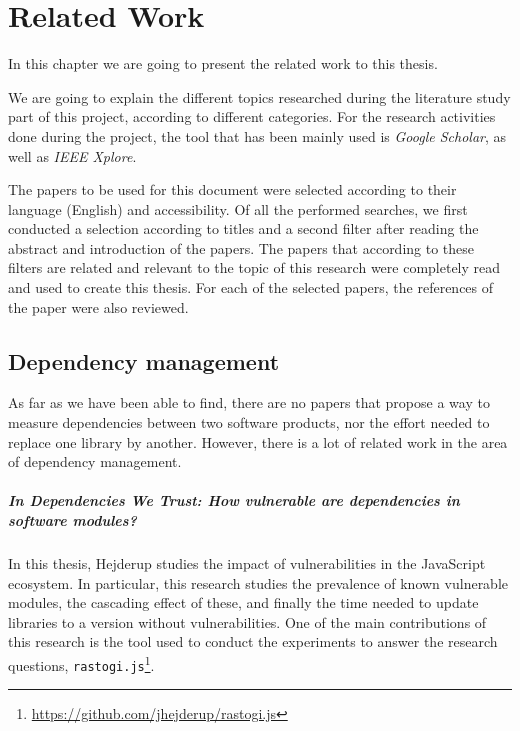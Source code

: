 \chapter{Related Work}\label{ch:RelatedWork}
In this chapter we are going to present the related work to this thesis.

We are going to explain the different topics researched during the literature study part of this project, according to different categories.
For the research activities done during the project, the tool that has been mainly used is \textit{Google Scholar}, as well as \textit{IEEE Xplore}.

\blankl
The papers to be used for this document were selected according to their language (English) and accessibility. Of all the performed searches, we first conducted a selection according to titles and a second filter after reading the abstract and introduction of the papers.
The papers that according to these filters are related and relevant to the topic of this research were completely read and used to create this thesis. For each of the selected papers, the references of the paper were also reviewed.

\section{Dependency management}

As far as we have been able to find, there are no papers that propose a way to measure dependencies between two software products, nor the effort needed to replace one library by another. However, there is a lot of related work in the area of dependency management.

\paragraph{In Dependencies We Trust: How vulnerable are dependencies in software modules? \cite{hejderup2015dependencies}}
In this thesis, Hejderup studies the impact of vulnerabilities in the JavaScript ecosystem. In particular, this research studies the prevalence of known vulnerable modules, the cascading effect of these, and finally the time needed to update libraries to a version without vulnerabilities.
One of the main contributions of this research is the tool used to conduct the experiments to answer the research questions, \texttt{rastogi.js}\footnote{\href{https://github.com/jhejderup/rastogi.js}{https://github.com/jhejderup/rastogi.js}}.

